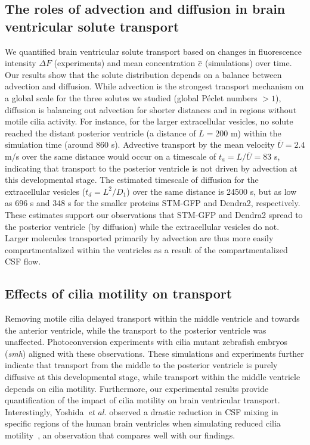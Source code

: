 \documentclass{WileyMSP-template}
\begin{document}
\subsection{The roles of advection and diffusion in brain ventricular solute transport}

We quantified brain ventricular solute transport based on changes in
fluorescence intensity $\Delta F$ (experiments) and mean concentration
$\overline{c}$ (simulations) over time. Our results show that the solute
distribution depends on a balance between advection and diffusion.
While advection is the strongest transport mechanism on a global scale
for the three solutes we studied (global Péclet numbers $> 1$),
diffusion is balancing out advection for shorter distances and in
regions without motile cilia activity.  For instance, for the larger
extracellular vesicles, no solute reached the distant posterior
ventricle (a distance of $L = 200$ \textmu m) within the simulation
time (around 860 s). Advective transport by the mean velocity
$\overline{U}=2.4$ \textmu m/s over the same distance would occur on a
timescale of $t_a=L/\overline{U}=83$ s, indicating that transport to
the posterior ventricle is not driven by advection at this
developmental stage. The estimated timescale of diffusion for the
extracellular vesicles ($t_d=L^2/D_1$) over the same distance is 24500
s, but as low as 696 s and 348 s for the smaller proteins STM-GFP and
Dendra2, respectively. These estimates support our observations that
STM-GFP and Dendra2 spread to the posterior ventricle (by diffusion)
while the extracellular vesicles do not. Larger molecules transported
primarily by advection are thus more easily compartmentalized within
the ventricles as a result of the compartmentalized CSF flow.

\subsection{Effects of cilia motility on transport}

Removing motile cilia delayed transport within
the middle ventricle and towards the anterior ventricle,
while the transport to the posterior ventricle was unaffected.
Photoconversion experiments with cilia mutant
zebrafish embryos (\emph{smh}) aligned with these observations.
These simulations and experiments further indicate that
transport from the middle to the posterior ventricle is
purely diffusive at this developmental stage,
while transport within the middle ventricle
depends on cilia motility.
Furthermore, our experimental results provide quantification
of the impact of cilia motility
on brain ventricular transport.
Interestingly, Yoshida~\emph{et al.} observed a drastic reduction
in CSF mixing in specific regions of the human brain
ventricles when simulating reduced cilia motility~\cite{Yoshida2022EffectVentricles},
an observation that compares well with our findings.  
\end{document}
